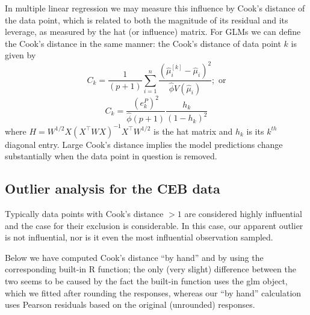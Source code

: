\documentclass[
]{book}
\begin{document}
In multiple linear regression we may measure this influence by Cook's distance of the data point, which is related to both the magnitude of its residual and its leverage, as measured by the hat (or influence) matrix. For GLMs we can define the Cook's distance in the same manner: the Cook's distance of data point \(k\) is given by
\[C_k = \frac{1}{(p+1)}\sum_{i=1}^n \frac{(\hat\mu_i^{[k]} - \hat\mu_i)^2}{\hat\phi V(\hat\mu_i)}; \text{ or}\]
\[C_k = \frac{(e^P_k)^2}{\hat\phi (p+1)}\frac{h_k}{(1-h_k)^2}\]
where \(H = W^{1/2}X(X^\top W X)^{-1}X^\top W^{1/2}\) is the hat matrix and \(h_k\) is its \(k^{th}\) diagonal entry. Large Cook's distance implies the model predictions change substantially when the data point in question is removed.

\hypertarget{outlier-analysis-for-the-ceb-data}{%
\subsection{Outlier analysis for the CEB data}\label{outlier-analysis-for-the-ceb-data}}

Typically data points with Cook's distance \(>1\) are considered highly influential and the case for their exclusion is considerable. In this case, our apparent outlier is not influential, nor is it even the most influential observation sampled.

Below we have computed Cook's distance ``by hand'' and by using the corresponding built-in R function; the only (very slight) difference between the two seems to be caused by the fact the built-in function uses the glm object, which we fitted after rounding the responses, whereas our ``by hand'' calculation uses Pearson residuals based on the original (unrounded) responses.
\end{document}
